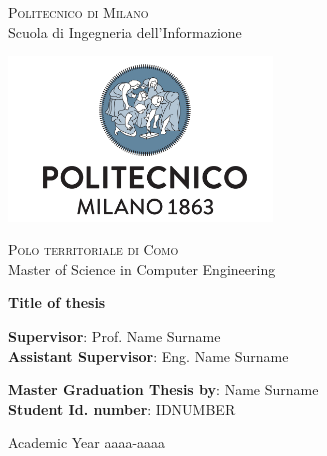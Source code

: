 \thispagestyle{empty}

\begin{center}

	\textsc{Politecnico di Milano}\\
 	Scuola di Ingegneria dell'Informazione\\  

 	\par\vskip 0.2cm

 	\includegraphics[width=7cm]{figures/polimi_logo.png}\\
  
 	\par\vskip 0.2cm  
  
  	\textsc{Polo territoriale di Como}\\
  	Master of Science in Computer Engineering\\  


  	\par\vskip 2cm
  	
\LARGE{ \bf	Title of thesis}


		
\end{center}

\par\vskip 1.5cm

\begin{flushleft}
  	\textbf{Supervisor}: Prof. Name Surname\\
    \textbf{Assistant Supervisor}: Eng. Name Surname\\
\end{flushleft}

\par\vskip 1cm

\begin{flushleft}
  	\textbf{Master Graduation Thesis by}: Name Surname \\
    \textbf{Student Id. number}:  IDNUMBER \\  
\end{flushleft}

\par\vskip 1cm

\begin{center}
 	Academic Year aaaa-aaaa
\end{center}




